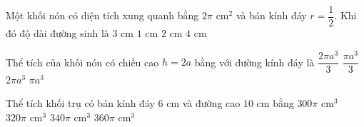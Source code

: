 \begin{ex}%
	Một khối nón có diện tích xung quanh bằng $2\pi$ cm$^2$ và bán kính đáy $r=\dfrac{1}{2}$. Khi đó độ dài đường sinh là
	\choice
	{$3$ cm}
	{$1$ cm}
	{$2$ cm}
	{\True $4$ cm}
\end{ex}
\begin{ex}%
	Thể tích của khối nón có chiều cao $h=2a$ bằng với đường kính đáy là
	\choice
	{\True $\dfrac{2\pi a^3}{3}$}
	{$\dfrac{\pi a^3}{3}$}
	{$2\pi a^3$}
	{$\pi a^3$}
\end{ex}
\begin{ex}%
	Thể tích khối trụ có bán kính đáy $6$ cm và đường cao $10$ cm bằng
	\choice
	{$300\pi \text{ cm}^3$}
	{$320\pi \text{ cm}^3$}
	{$340\pi \text{ cm}^3$}
	{\True $360\pi \text{ cm}^3$}
\end{ex}
